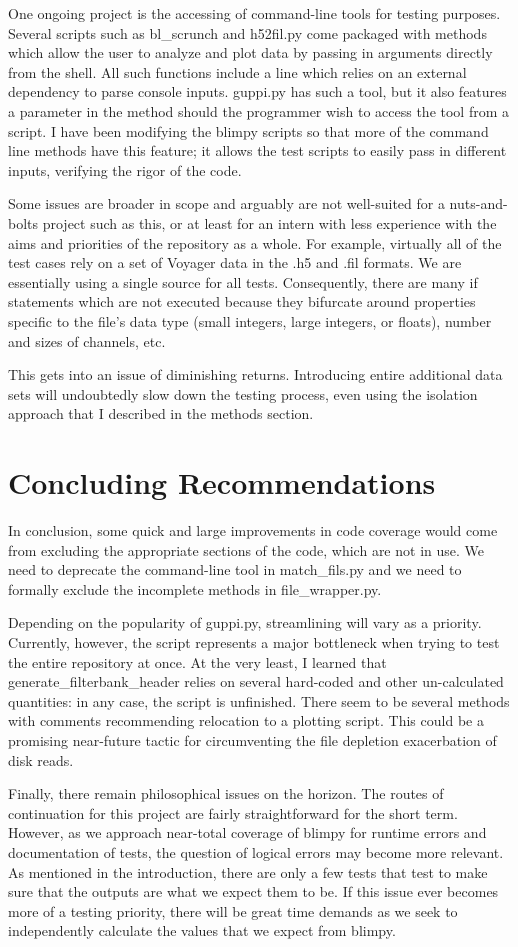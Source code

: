 \documentclass[12pt]{article}
\begin{document}
One ongoing project is the accessing of command-line tools for testing purposes. Several scripts such as bl\_scrunch and h52fil.py come packaged with methods which allow the user to analyze and plot data by passing in arguments directly from the shell. All such functions include a line which relies on an external dependency to parse console inputs. guppi.py has such a tool, but it also features a parameter in the method should the programmer wish to access the tool from a script. I have been modifying the blimpy scripts so that more of the command line methods have this feature; it allows the test scripts to easily pass in different inputs, verifying the rigor of the code.

Some issues are broader in scope and arguably are not well-suited for a nuts-and-bolts project such as this, or at least for an intern with less experience with the aims and priorities of the repository as a whole. For example, virtually all of the test cases rely on a set of Voyager data in the .h5 and .fil formats. We are essentially using a single source for all tests. Consequently, there are many if statements which are not executed because they bifurcate around properties specific to the file's data type (small integers, large integers, or floats), number and sizes of channels, etc.

This gets into an issue of diminishing returns. Introducing entire additional data sets will undoubtedly slow down the testing process, even using the isolation approach that I described in the methods section.

\section{Concluding Recommendations}

\quad \quad In conclusion, some quick and large improvements in code coverage would come from excluding the appropriate sections of the code, which are not in use. We need to deprecate the command-line tool in match\_fils.py and we need to formally exclude the incomplete methods in file\_wrapper.py.

Depending on the popularity of guppi.py, streamlining will vary as a priority. Currently, however, the script represents a major bottleneck when trying to test the entire repository at once. At the very least, I learned that generate\_filterbank\_header relies on several hard-coded and other un-calculated quantities: in any case, the script is unfinished. There seem to be several methods with comments recommending relocation to a plotting script. This could be a promising near-future tactic for circumventing the file depletion exacerbation of disk reads.

Finally, there remain philosophical issues on the horizon. The routes of continuation for this project are fairly straightforward for the short term. However, as we approach near-total coverage of blimpy for runtime errors and documentation of tests, the question of logical errors may become more relevant. As mentioned in the introduction, there are only a few tests that test to make sure that the outputs are what we expect them to be. If this issue ever becomes more of a testing priority, there will be great time demands as we seek to independently calculate the values that we expect from blimpy.
\end{document}
